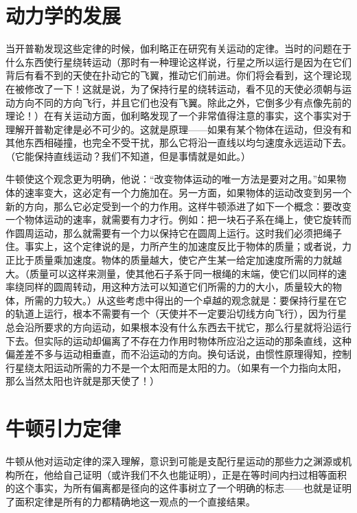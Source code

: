 \documentclass[12pt,oneside]{book}
\begin{document}
\begin{common-format}
\section{动力学的发展}
当开普勒发现这些定律的时候，伽利略正在研究有关运动的定律。当时的问题在于什么东西使行星绕转运动（那时有一种理论这样说，行星之所以运行是因为在它们背后有看不到的天使在扑动它的飞翼，推动它们前进。你们将会看到，这个理论现在被修改了一下！这就是说，为了保持行星的绕转运动，看不见的天使必须朝与运动方向不同的方向飞行，并且它们也没有飞翼。除此之外，它倒多少有点像先前的理论！）在有关运动方面，伽利略发现了一个非常值得注意的事实，这个事实对于理解开普勒定律是必不可少的。这就是原理——如果有某个物体在运动，但没有和其他东西相碰撞，也完全不受干扰，那么它将沿一直线以均匀速度永远运动下去。（它能保持直线运动？我们不知道，但是事情就是如此。）

牛顿使这个观念更为明确，他说：“改变物体运动的唯一方法是要对之用。”如果物体的速率变大，这必定有一个力施加在。另一方面，如果物体的运动改变到另一个新的方向，那么它必定受到一个的力作用。这样牛顿添进了如下一个概念：要改变一个物体运动的速率，就需要有力才行。例如：把一块石子系在绳上，使它旋转而作圆周运动，那么就需要有一个力以保持它在圆周上运行。这时我们必须把绳子住。事实上，这个定律说的是，力所产生的加速度反比于物体的质量；或者说，力正比于质量乘加速度。物体的质量越大，使它产生某一给定加速度所需的力就越大。（质量可以这样来测量，使其他石子系于同一根绳的末端，使它们以同样的速率绕同样的圆周转动，用这种方法可以知道它们所需的力的大小，质量较大的物体，所需的力较大。）从这些考虑中得出的一个卓越的观念就是：要保持行星在它的轨道上运行，根本不需要有一个（天使并不一定要沿切线方向飞行），因为行星总会沿所要求的方向运动，如果根本没有什么东西去干扰它，那么行星就将沿运行下去。但实际的运动却偏离了不存在力作用时物体所应沿之运动的那条直线，这种偏差差不多与运动相垂直，而不沿运动的方向。换句话说，由惯性原理得知，控制行星绕太阳运动所需的力不是一个太阳而是太阳的力。（如果有一个力指向太阳，那么当然太阳也许就是那天使了！）


\section{牛顿引力定律}
牛顿从他对运动定律的深入理解，意识到可能是支配行星运动的那些力之渊源或机构所在，他给自己证明（或许我们不久也能证明），正是在等时间内扫过相等面积的这个事实，为所有偏离都是径向的这件事树立了一个明确的标志——也就是证明了面积定律是所有的力都精确地这一观点的一个直接结果。


\end{common-format}
\end{document}
